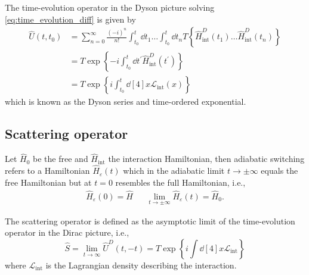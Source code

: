 \begin{theorem}\label{thm:time_evolution_exp_sol}
	The time-evolution operator in the Dyson picture solving \cref{eq:time_evolution_diff} is given by
	\begin{equation}
		\begin{split}
			\hat{U}(t,t_0)
			&=
			\sum_{n=0}^\infty
			\frac{(-i)^n}{n!}
			\int_{t_0}^t\dd{t_1}
			\dots
			\int_{t_0}^t\dd{t_n}
			T\left\{
				\hat{H}^D_\text{int}(t_1)
				\dots
				\hat{H}^D_\text{int}(t_n)
			\right\}
			\\
			&=
			T\exp\left\{
				-i
				\int_{t_0}^t
				\dd{t^\prime}
				\hat{H}^D_\text{int}(t^\prime)
			\right\}
			\\
			&=
			T\exp\left\{
				i
				\int_{t_0}^t
				\dd[4]{x}
				\mathcal{L}_\text{int}(x)
			\right\}			
		\end{split}
		\label{eq:time_evolution_sol}
	\end{equation}
	which is known as the Dyson series and time-ordered exponential.
\end{theorem}

\subsection{Scattering operator}

\begin{definition}
	Let $\hat{H}_0$ be the free and $\hat{H}_\text{int}$ the interaction Hamiltonian, then adiabatic switching refers to a Hamiltonian $\hat{H}_\varepsilon(t)$ which in the adiabatic limit $t\to\pm\infty$ equals the free Hamiltonian but at $t=0$ resembles the full Hamiltonian, i.e.,
	\begin{align}
		\hat{H}_\varepsilon(0)
		=
		\hat{H}
		&&
		\lim_{t\to\pm\infty}
		\hat{H}_\varepsilon(t)
		=
		\hat{H}_0
		.
	\end{align}
\end{definition}
\begin{definition}\label{thm:scattering_operator}
	The scattering operator is defined as the asymptotic limit of the time-evolution operator in the Dirac picture, i.e.,
	\begin{equation}
		\hat{S}
		=
		\lim_{t\to\infty}
		\hat{U}^D(t,-t)
		=
		T\exp\left\{
			i\int\dd[4]{x}
			\mathcal{L}_\text{int}
		\right\}
	\end{equation}
	where $\mathcal{L}_\text{int}$ is the Lagrangian density describing the interaction.
\end{definition}

